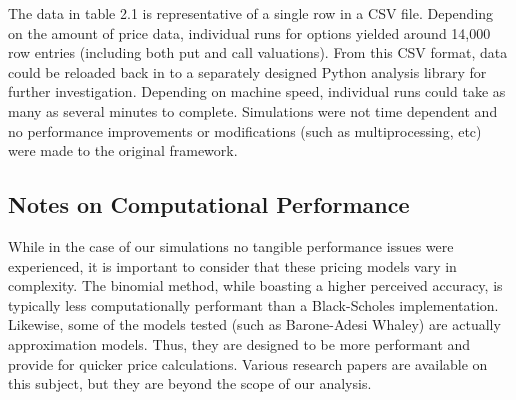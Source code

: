 The data in table 2.1 is representative of a single row in a CSV file. Depending on the amount of price data, individual runs for options yielded around 14,000 row entries (including both put and call valuations). From this CSV format, data could be reloaded back in to a separately designed Python analysis library for further investigation. Depending on machine speed, individual runs could take as many as several minutes to complete. Simulations were not time dependent and no performance improvements or modifications (such as multiprocessing, etc) were made to the original framework. 

\subsection{Notes on Computational Performance}
While in the case of our simulations no tangible performance issues were experienced, it is important to consider that these pricing models vary in complexity. The binomial method, while boasting a higher perceived accuracy, is typically less computationally performant than a Black-Scholes implementation. Likewise, some of the models tested (such as Barone-Adesi Whaley) are actually approximation models. Thus, they are designed to be more performant and provide for quicker price calculations. Various research papers are available on this subject, but they are beyond the scope of our analysis.